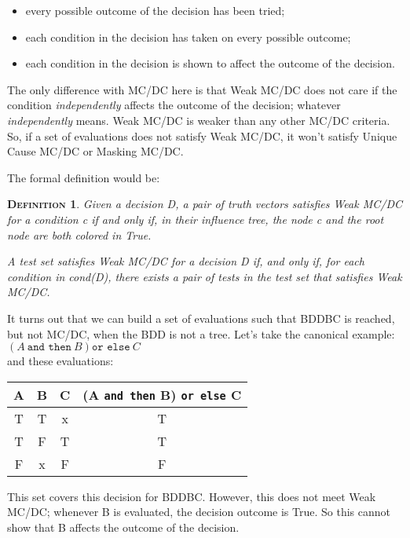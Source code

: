 \documentclass[a4paper,12pt,twoside]{article}
\newcommand{\andthen}{\texttt{and then}}
\newcommand{\orelse}{\texttt{or else}}
\newtheorem{definition}{\textsc{Definition}}
\begin{document}
\begin{itemize}
\item every possible outcome of the decision has been tried;
\item each condition in the decision has taken on every possible outcome;
\item each condition in the decision is shown to affect the outcome of the
      decision.
\end{itemize}

The only difference with MC/DC here is that Weak MC/DC does not care
if the condition \textit{independently} affects the outcome of the decision;
whatever \textit{independently} means. Weak MC/DC is weaker than any other
MC/DC criteria. So, if a set of evaluations does not satisfy Weak MC/DC,
it won't satisfy Unique Cause MC/DC or Masking MC/DC.

The formal definition would be:

\begin{definition}
  \label{def:weak-mcdc}
  Given a decision D, a pair of truth vectors satisfies Weak MC/DC for
  a condition c if and only if, in their influence tree, the node c
  and the root node are both colored in True.

  A test set satisfies Weak MC/DC for a decision D if, and only if,
  for each condition in cond(D), there exists a pair of tests in the
  test set that satisfies Weak MC/DC.
\end{definition}

It turns out that we can build a set of evaluations such that BDDBC is
reached, but not MC/DC, when the BDD is not a tree.  Let's take the
canonical example:\\
$(A \ \andthen{} \ B) \orelse{} \ C$\\
and these evaluations:

\begin{center}
\begin{tabular}{|c|c|c||c|}
\hline
A & B & C & (A \andthen{} B) \orelse{} C \\ \hline
T & T & x & T \\ \hline
T & F & T & T \\ \hline
F & x & F & F \\ \hline
\end{tabular}
\end{center}

This set covers this decision for BDDBC. However, this does not meet
Weak MC/DC; whenever B is evaluated, the decision outcome is True. So
this cannot show that B affects the outcome of the decision.
\end{document}
